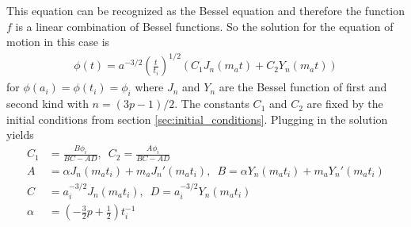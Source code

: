\documentclass[twoside,a4paper, 12pt]{article}
\numberwithin{equation}{section}
\begin{document}
This equation can be recognized as the Bessel equation and therefore the function $f$ is a linear combination of Bessel functions.
So the solution for the equation of motion in this case is
\begin{align*}
    \phi(t) = a^{-3/2} \left(\frac{t}{t_i}\right)^{1/2}\left(C_1 J_n(m_a t) + C_2 Y_n(m_a t)\right)
\end{align*}
for $\phi(a_i) = \phi(t_i) = \phi_i$
where $J_n$ and $Y_n$ are the Bessel function of first and second kind with $n = (3p - 1) / 2$.
The constants $C_1$ and $C_2$ are fixed by the initial conditions from section \ref{sec:initial_conditions}.
\newpage
\noindent Plugging in the solution yields
\begin{align*}
    C_1 &= \frac{B \phi_i}{BC - AD}, \, \, \,
    C_2 = \frac{A \phi_i}{BC - AD} \\
    A &= \alpha J_n(m_a t_i) + m_a J_n'(m_a t_i), \, \, \,
    B = \alpha Y_n(m_a t_i) + m_a Y_n'(m_a t_i) \\
    C &= a_i^{-3/2} J_n(m_a t_i), \, \, \,
    D = a_i^{-3/2} Y_n(m_a t_i) \\
    \alpha &= \left(-\frac{3}{2} p + \frac{1}{2}\right) t_i^{-1}
\end{align*}
\end{document}
